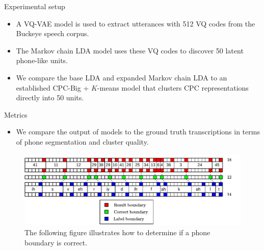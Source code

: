 \documentclass[final]{beamer}
\begin{document}
\begin{frame}[t]
\begin{columns}[T]
\begin{column}{.33\linewidth}
\begin{minipage}[T]{.97\textwidth}
{\begin{block}{Experimental setup}
                        \begin{itemize}
                            \vspace{-0.5cm}
                            \setlength{\itemsep}{0.5ex}
                            \item A VQ-VAE model is used to extract utterances with 512 VQ codes from the Buckeye speech corpus.
                            \item The Markov chain LDA model uses these VQ codes to discover 50 latent phone-like units.
                            \item We compare the base LDA and expanded Markov chain LDA to an established CPC-Big + \(K\)-means model that clusters CPC representations directly into 50 units.

                        \end{itemize}
                    \end{block}

                    \begin{block}{Metrics} %

                        \begin{itemize}
                            \vspace{-0.4ex}
                            \setlength{\itemsep}{0.5ex}
                            \item We compare the output of models to the ground truth transcriptions in terms of phone segmentation and cluster quality.
                        \end{itemize}

                        \begin{figure}[!t]
                            \centering
                            \includegraphics[width=0.95\linewidth]{figures/phone_boundaries}
                            \caption[Phone boundary example]{
                                The following figure illustrates how to determine if a phone boundary is correct.
                            }
                            \label{fig:phone_boundaries}
                        \end{figure}
                    \end{block}


}
\end{minipage}
\end{column}
\end{columns}
\end{frame}
\end{document}
